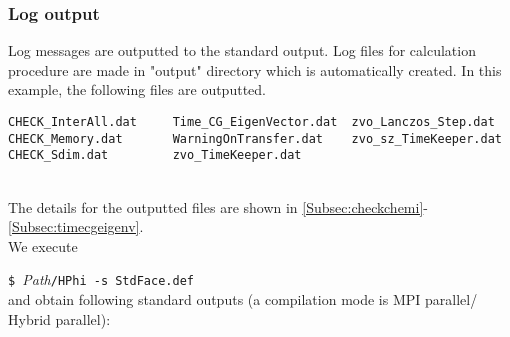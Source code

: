 \subsubsection{Log output}
{Log messages are outputted to the standard output.
Log files for calculation procedure are made in "output" directory which is automatically created.
In this example, the following files are outputted.\\}
\begin{minipage}{16cm}
\begin{screen}
\begin{verbatim}
CHECK_InterAll.dat     Time_CG_EigenVector.dat  zvo_Lanczos_Step.dat  
CHECK_Memory.dat       WarningOnTransfer.dat    zvo_sz_TimeKeeper.dat
CHECK_Sdim.dat         zvo_TimeKeeper.dat
\end{verbatim}
\end{screen}
\end{minipage}
\\
The details for the outputted files are shown in \ref{Subsec:checkchemi}-\ref{Subsec:timecgeigenv}.
\\
We execute

\hspace{-0.7cm}
\verb|$ |\textit{Path}\verb|/HPhi -s StdFace.def|
\\
and obtain following standard outputs {(a compilation mode is MPI parallel/ Hybrid parallel)}:

